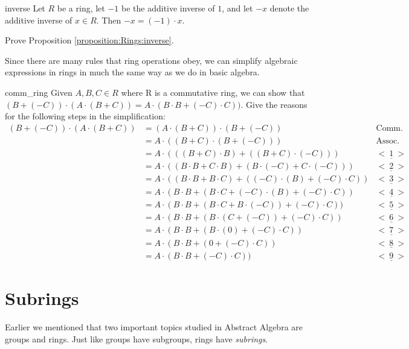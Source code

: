 \begin{prop}{inverse}
Let $R$ be a ring, let $-1$ be the additive inverse of $1$, and let $-x$ denote the additive inverse of $x\in R$. Then $-x=(-1)\cdot x$.
\end{prop}

\begin{exercise}{}
Prove Proposition \ref{proposition:Rings:inverse}.
\end{exercise}

Since there are many rules that ring operations obey,
we can simplify algebraic expressions in rings in much the same way as we do in basic algebra.

\begin{exercise}{comm_ring}
Given $A,B,C\in R$ where R is a commutative ring, we can show that $(B+(-C))\cdot(A\cdot(B+C))=A\cdot(B\cdot B+(-C)\cdot C))$. Give the reasons for the following steps in the simplification:
\begin{align*}
(B+(-C))\cdot(A\cdot(B+C))&=(A\cdot(B+C))\cdot(B+(-C)) & \text{Comm. prop.}\\   
&=A\cdot((B+C)\cdot(B+(-C))) & \text{Assoc. prop.}\\
&=A\cdot(((B+C)\cdot B)+((B+C)\cdot(-C))) & \underline{<~1~>}\\
&=A\cdot((B\cdot B+C\cdot B)+(B\cdot (-C)+C\cdot (-C))) & \underline{<~2~>}\\
&=A\cdot((B\cdot B+B\cdot C)+((-C)\cdot(B)+(-C)\cdot C))  & \underline{<~3~>}\\
&=A\cdot(B\cdot B+(B\cdot C+(-C)\cdot(B)+(-C)\cdot C))  & \underline{<~4~>}\\
&=A\cdot(B\cdot B+(B\cdot C+B\cdot(-C))+(-C)\cdot C)) & \underline{<~5~>}\\
&=A\cdot(B\cdot B+(B\cdot(C+(-C))+(-C)\cdot C)) & \underline{<~6~>}\\
&=A\cdot(B\cdot B+(B\cdot(0)+(-C)\cdot C)) & \underline{<~7~>}\\
&=A\cdot(B\cdot B+(0+(-C)\cdot C)) & \underline{<~8~>}\\
&=A\cdot(B\cdot B+(-C)\cdot C)) & \underline{<~9~>}
\end{align*}
\end{exercise}

\section{Subrings}
\label{sec:Rings:Subrings}

Earlier we mentioned that two important topics studied in Abstract Algebra are groups and rings. Just like groups have subgroups, rings have \emph{subrings}.


